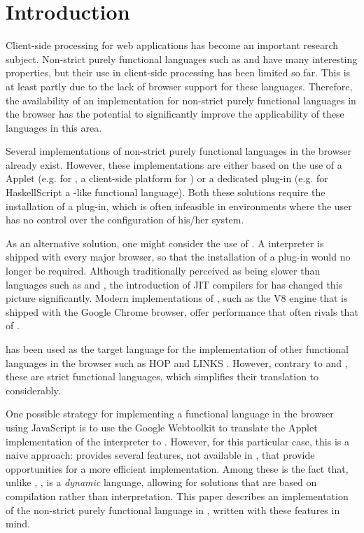 \section{Introduction}\label{sapljs:sec:intro}
Client-side processing for web applications has become an important research
subject. Non-strict purely functional languages such as \Haskell and \Clean have
many interesting properties, but their use in client-side processing has been
limited so far. This is at least partly due to the lack of browser support for
these languages. Therefore, the availability of  an implementation for
non-strict purely functional languages in the browser has the potential to
significantly improve the applicability of these languages in this area.

Several implementations of non-strict purely functional languages in the browser
already exist. However, these implementations are either based on the use of a
\Java Applet (e.g. for \Sapl, a client-side platform for \Clean
\cite{JKP,PJKA}) or a dedicated plug-in (e.g. for \textsf{HaskellScript} 
\cite{HaskellScript} a \Haskell-like functional language). Both these solutions
require the installation of a plug-in, which is often infeasible in environments
where the user has no control over the configuration of his/her system.

As an alternative solution, one might consider the use of \JavaScript. A
\JavaScript interpreter is shipped with every major browser, so that the
installation of a plug-in would no longer be required.  Although traditionally
perceived as being slower than languages such as \Java and \C, the introduction 
of JIT compilers for \JavaScript has changed this picture significantly. Modern
implementations of \JavaScript, such as the V8 engine that is shipped with the
Google Chrome browser, offer performance that often rivals that of \Java.

\JavaScript has been used as the target language for the implementation of
other functional languages in the browser such as HOP and LINKS
\cite{HOP1,HOP2,LINKS1}. However, contrary to \Haskell and \Clean, these are
strict functional languages, which simplifies their translation to \JavaScript
considerably.

One possible strategy for implementing a functional language in the browser
using JavaScript is to use the Google Webtoolkit to translate the \Java Applet
implementation of the \Sapl interpreter to \JavaScript. However, for this
particular case, this is a naive approach: \JavaScript provides several
features, not available in \Java, that provide opportunities for a more
efficient implementation. Among these is the fact that, unlike \Java,
\JavaScript, is a {\em dynamic} language, allowing for solutions that are based
on compilation rather than interpretation. This paper describes an
implementation of the non-strict purely functional language \Sapl in
\JavaScript, written with these features in mind.

